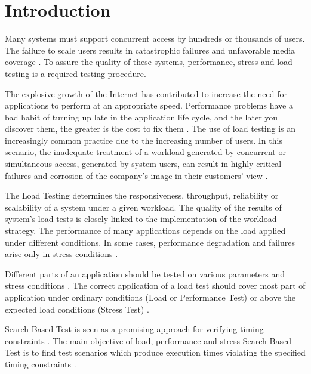 \section{Introduction}

Many systems must support concurrent
access by hundreds or thousands of users. The failure to scale users results in catastrophic failures and unfavorable media coverage \cite{Jiang2010}. To assure the quality of these systems, performance, stress and load testing is a required testing procedure\cite{Jiang2009}. 

The explosive growth of the Internet has contributed to  increase the need for applications to perform at an appropriate speed. Performance problems have a bad habit of turning up late in the application life cycle, and the later you discover them,  the greater is the cost to fix them \cite{Molyneaux2009}.
%
%
%
% 
%
The use of load testing is an increasingly common practice due to the increasing number of users. In this scenario, the inadequate treatment of a workload generated by concurrent or simultaneous
access, generated by system users, can result in highly critical failures and corrosion of the company's image in their customers' view \cite{Draheim2006b} \cite{Jiang2010}. 
%
%

The Load Testing determines the responsiveness, throughput, reliability or scalability of a system under a given workload. The quality of the results of system's load tests is closely linked to the implementation of the workload strategy. The performance of many applications depends on the load applied under different conditions. In some cases, performance degradation and failures arise only in stress conditions \cite{Garousi2010} \cite{Jiang2010}.


Different parts of an application should be tested on various parameters and stress conditions \cite{Babbar2011}. The correct application of a load test should cover most part of application under ordinary conditions (Load or Performance Test) or above the expected load conditions (Stress Test) \cite{Draheim2006b} \cite{Luiz2011} \cite{Fe2004}.

Search Based  Test is seen as a promising approach for verifying timing constraints \cite{Afzal2009a}. The main objective of load, performance and stress Search Based Test is to find test scenarios which produce execution times violating the specified timing constraints \cite{Sullivan}. 

